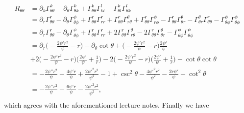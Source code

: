 \documentclass[12pt]{article}
\numberwithin{equation}{section}
\begin{document}
\begin{equation}
\begin{aligned}
R_{\theta \theta} &= \partial_k \Gamma^k_{\theta \theta} - \partial_\theta \Gamma^k_{\theta k} + \Gamma^k_{\theta \theta} \Gamma^l_{kl} - \Gamma^k_{\theta l} \Gamma^l_{\theta k} \\
&= \partial_r \Gamma^r_{\theta \theta} - \partial_\theta \Gamma^\phi_{\theta \phi} + \Gamma^r_{\theta \theta} \Gamma^r_{rr} + \Gamma^r_{\theta \theta} \Gamma^\theta_{r\theta} + \Gamma^r_{\theta \theta} \Gamma^\phi_{r\phi} - \Gamma^r_{\theta \theta} \Gamma^\theta_{\theta r} - \Gamma^\theta_{\theta r} \Gamma^r_{\theta \theta} - \Gamma^\phi_{\theta \phi} \Gamma^\phi_{\theta \phi} \\
&= \partial_r \Gamma^r_{\theta \theta} - \partial_\theta \Gamma^\phi_{\theta \phi} + \Gamma^r_{\theta \theta} \Gamma^r_{rr} + 2 \Gamma^r_{\theta \theta} \Gamma^\theta_{r\theta} - 2 \Gamma^r_{\theta \theta} \Gamma^\theta_{\theta r} - \Gamma^\phi_{\theta \phi} \Gamma^\phi_{\theta \phi} \\
&= \partial_r \Big( - \frac{2 \psi' r^2}{\psi} - r \Big) - \partial_\theta \cot \theta + \Big( - \frac{2 \psi' r^2}{\psi} - r \Big) \frac{2 \psi'}{\psi} \\
&+ 2 \Big( - \frac{2 \psi' r^2}{\psi} - r \Big) \Big( \frac{2 \psi'}{\psi}  + \frac{1}{r} \Big) - 2 \Big( - \frac{2 \psi' r^2}{\psi} - r \Big) \Big( \frac{2 \psi'}{\psi}  + \frac{1}{r} \Big) - \cot \theta \cot \theta \\
&=  - \frac{2 \psi'' r^2}{\psi} - \frac{4 \psi' r}{\psi} + \frac{2 \psi'^2 r^2}{\psi^2} - 1 + \csc^2 \theta - \frac{4 \psi'^2 r^2}{\psi^2} - \frac{2 r \psi'}{\psi} - \cot^2 \theta \\
&=  - \frac{2 \psi'' r^2}{\psi} - \frac{6 \psi' r}{\psi} - \frac{2 \psi'^2 r^2}{\psi^2}, \\
\end{aligned}
\end{equation}
which agrees with the aforementioned lecture notes.  Finally we have
\end{document}
